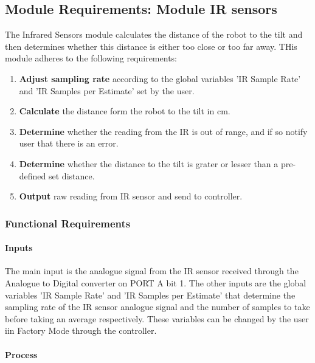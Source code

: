 \documentclass{article}
\begin{document}
\subsection{Module Requirements: Module IR sensors}
The Infrared Sensors module calculates the distance of the robot to the tilt and then determines whether this distance is either too close or too far away. THis module adheres to the following requirements:
\begin{enumerate}
	\item \textbf{Adjust sampling rate} according to the global variables 'IR Sample Rate' and 'IR Samples per Estimate' set by the user.
	\item \textbf{Calculate} the distance form the robot to the tilt in cm. 
	\item \textbf{Determine} whether the reading from the IR is out of range, and if so notify user that there is an error.	
	\item \textbf{Determine} whether the distance to the tilt is grater or lesser than a pre-defined set distance.
	\item \textbf{Output} raw reading from IR sensor and send to controller.
\end{enumerate} 

\subsubsection{Functional Requirements}
\paragraph{Inputs}

The main input is the analogue signal from the IR sensor received through the Analogue to Digital converter on PORT A bit 1. 
The other inputs are the global variables 'IR Sample Rate' and 'IR Samples per Estimate' that determine the sampling rate of the IR sensor analogue signal and the number of samples to take before taking an average respectively. These variables can be changed by the user iin Factory Mode through the controller.  

\paragraph{Process}
\end{document}
